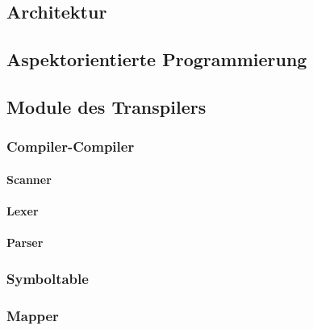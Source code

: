 
\subsection{Architektur} 


\subsection{Aspektorientierte Programmierung}
 
\subsection{Module des Transpilers}
\subsubsection{Compiler-Compiler}
\paragraph{Scanner}
\paragraph{Lexer}
\paragraph{Parser}
\subsubsection{Symboltable}

\subsubsection{Mapper}

